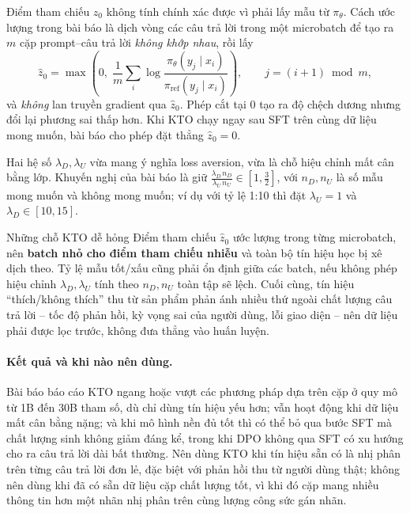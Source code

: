 Điểm tham chiếu \( z_0 \) không tính chính xác được vì phải lấy mẫu từ \( \pi_{\theta} \). Cách ước lượng trong bài báo là dịch vòng các câu trả lời trong một microbatch để tạo ra \( m \) cặp prompt--câu trả lời \emph{không khớp nhau}, rồi lấy
\[
    \hat{z}_0 = \max\!\left( 0,\; \frac{1}{m} \sum_{i} \log \frac{\pi_{\theta}(y_j \mid x_i)}{\pi_{\text{ref}}(y_j \mid x_i)} \right),
    \qquad j = (i+1) \bmod m,
\]
và \emph{không} lan truyền gradient qua \( \hat{z}_0 \). Phép cắt tại 0 tạo ra độ chệch dương nhưng đổi lại phương sai thấp hơn. Khi KTO chạy ngay sau SFT trên cùng dữ liệu mong muốn, bài báo cho phép đặt thẳng \( \hat{z}_0 = 0 \).

Hai hệ số \( \lambda_D, \lambda_U \) vừa mang ý nghĩa loss aversion, vừa là chỗ hiệu chỉnh mất cân bằng lớp. Khuyến nghị của bài báo là giữ \( \frac{\lambda_D\, n_D}{\lambda_U\, n_U} \in \left[1, \tfrac{3}{2}\right] \), với \( n_D, n_U \) là số mẫu mong muốn và không mong muốn; ví dụ với tỷ lệ 1:10 thì đặt \( \lambda_U = 1 \) và \( \lambda_D \in [10, 15] \).

\begin{pitfall}{Những chỗ KTO dễ hỏng}
Điểm tham chiếu \( \hat{z}_0 \) ước lượng trong từng microbatch, nên \textbf{batch nhỏ cho điểm tham chiếu nhiễu} và toàn bộ tín hiệu học bị xê dịch theo. Tỷ lệ mẫu tốt/xấu cũng phải ổn định giữa các batch, nếu không phép hiệu chỉnh \( \lambda_D, \lambda_U \) tính theo \( n_D, n_U \) toàn tập sẽ lệch. Cuối cùng, tín hiệu ``thích/không thích'' thu từ sản phẩm phản ánh nhiều thứ ngoài chất lượng câu trả lời -- tốc độ phản hồi, kỳ vọng sai của người dùng, lỗi giao diện -- nên dữ liệu phải được lọc trước, không đưa thẳng vào huấn luyện.
\end{pitfall}

\paragraph{Kết quả và khi nào nên dùng.} Bài báo báo cáo KTO ngang hoặc vượt các phương pháp dựa trên cặp ở quy mô từ 1B đến 30B tham số, dù chỉ dùng tín hiệu yếu hơn; vẫn hoạt động khi dữ liệu mất cân bằng nặng; và khi mô hình nền đủ tốt thì có thể bỏ qua bước SFT mà chất lượng sinh không giảm đáng kể, trong khi DPO không qua SFT có xu hướng cho ra câu trả lời dài bất thường. Nên dùng KTO khi tín hiệu sẵn có là nhị phân trên từng câu trả lời đơn lẻ, đặc biệt với phản hồi thu từ người dùng thật; không nên dùng khi đã có sẵn dữ liệu cặp chất lượng tốt, vì khi đó cặp mang nhiều thông tin hơn một nhãn nhị phân trên cùng lượng công sức gán nhãn.

